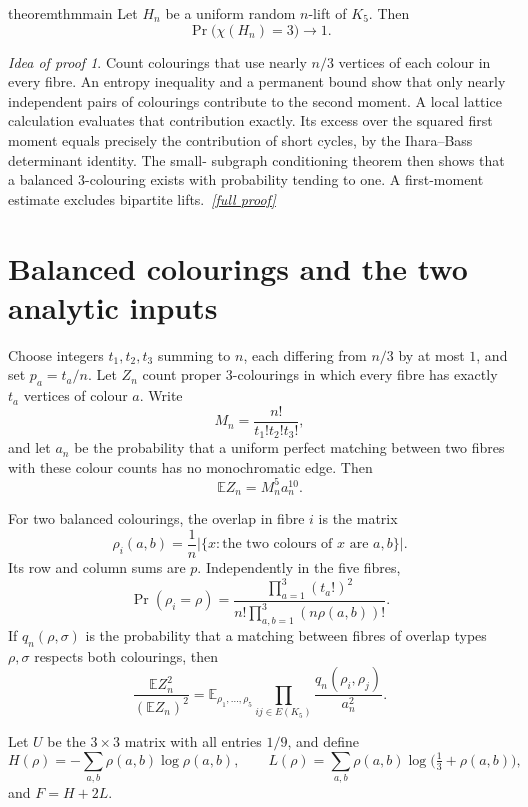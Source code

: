 \documentclass[11pt,a4paper]{article}
\theoremstyle{plain}
\theoremstyle{definition}
\theoremstyle{remark}
\newtheorem*{proofidea}{Idea of proof}
\newcommand{\fullproofref}[1]{\,\hyperref[#1]{\textit{[full proof]}}}
\newcommand{\E}{\mathbb E}
\begin{document}
\begin{restatable}{theorem}{thmmain}\label{thm:main}
Let $H_n$ be a uniform random $n$-lift of $K_5$.  Then
\[
 \Pr\bigl(\chi(H_n)=3\bigr)\longrightarrow1.
\]
\end{restatable}
\begin{proofidea}
Count colourings that use nearly $n/3$ vertices of each colour in every fibre.  An
entropy inequality and a permanent bound show that only nearly independent pairs of
colourings contribute to the second moment.  A local lattice calculation evaluates
that contribution exactly.  Its excess over the squared first moment equals precisely
the contribution of short cycles, by the Ihara--Bass determinant identity.  The small-
subgraph conditioning theorem then shows that a balanced $3$-colouring exists with
probability tending to one.  A first-moment estimate excludes bipartite lifts.
\fullproofref{pf:main}
\end{proofidea}

\section{Balanced colourings and the two analytic inputs}

Choose integers $t_1,t_2,t_3$ summing to $n$, each differing from $n/3$ by at most
$1$, and set $p_a=t_a/n$.  Let $Z_n$ count proper $3$-colourings in which every fibre
has exactly $t_a$ vertices of colour $a$.  Write
\[
 M_n=\frac{n!}{t_1!t_2!t_3!},
\]
and let $a_n$ be the probability that a uniform perfect matching between two fibres
with these colour counts has no monochromatic edge.  Then
\[
 \E Z_n=M_n^5a_n^{10}.                                         \tag{1}
\]

For two balanced colourings, the overlap in fibre $i$ is the matrix
\[
 \rho_i(a,b)=\frac1n\bigl|\{x:\text{the two colours of $x$ are $a,b$}\}\bigr|.
\]
Its row and column sums are $p$.  Independently in the five fibres,
\[
 \Pr(\rho_i=\rho)=
 \frac{\prod_{a=1}^3(t_a!)^2}{n!\prod_{a,b=1}^3(n\rho(a,b))!}.  \tag{2}
\]
If $q_n(\rho,\sigma)$ is the probability that a matching between fibres of overlap
types $\rho,\sigma$ respects both colourings, then
\[
 \frac{\E Z_n^2}{(\E Z_n)^2}
 =\E_{\rho_1,\ldots,\rho_5}
 \prod_{ij\in E(K_5)}\frac{q_n(\rho_i,\rho_j)}{a_n^2}.           \tag{3}
\]

Let $U$ be the $3\times3$ matrix with all entries $1/9$, and define
\[
 H(\rho)=-\sum_{a,b}\rho(a,b)\log\rho(a,b),\qquad
 L(\rho)=\sum_{a,b}\rho(a,b)\log\bigl(\tfrac13+\rho(a,b)\bigr),
\]
and $F=H+2L$.
\end{document}
